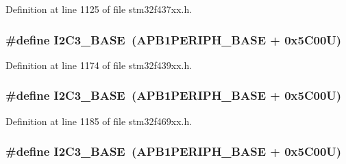 Definition at line 1125 of file stm32f437xx.\+h.

\subsubsection[{\texorpdfstring{I2\+C3\+\_\+\+B\+A\+SE}{I2C3_BASE}}]{\setlength{\rightskip}{0pt plus 5cm}\#define I2\+C3\+\_\+\+B\+A\+SE~({\bf A\+P\+B1\+P\+E\+R\+I\+P\+H\+\_\+\+B\+A\+SE} + 0x5\+C00\+U)}\hypertarget{group___peripheral__memory__map_ga4e8b9198748235a1729e1e8f8f24983b}{}\label{group___peripheral__memory__map_ga4e8b9198748235a1729e1e8f8f24983b}


Definition at line 1174 of file stm32f439xx.\+h.

\subsubsection[{\texorpdfstring{I2\+C3\+\_\+\+B\+A\+SE}{I2C3_BASE}}]{\setlength{\rightskip}{0pt plus 5cm}\#define I2\+C3\+\_\+\+B\+A\+SE~({\bf A\+P\+B1\+P\+E\+R\+I\+P\+H\+\_\+\+B\+A\+SE} + 0x5\+C00\+U)}\hypertarget{group___peripheral__memory__map_ga4e8b9198748235a1729e1e8f8f24983b}{}\label{group___peripheral__memory__map_ga4e8b9198748235a1729e1e8f8f24983b}


Definition at line 1185 of file stm32f469xx.\+h.

\subsubsection[{\texorpdfstring{I2\+C3\+\_\+\+B\+A\+SE}{I2C3_BASE}}]{\setlength{\rightskip}{0pt plus 5cm}\#define I2\+C3\+\_\+\+B\+A\+SE~({\bf A\+P\+B1\+P\+E\+R\+I\+P\+H\+\_\+\+B\+A\+SE} + 0x5\+C00\+U)}\hypertarget{group___peripheral__memory__map_ga4e8b9198748235a1729e1e8f8f24983b}{}\label{group___peripheral__memory__map_ga4e8b9198748235a1729e1e8f8f24983b}


